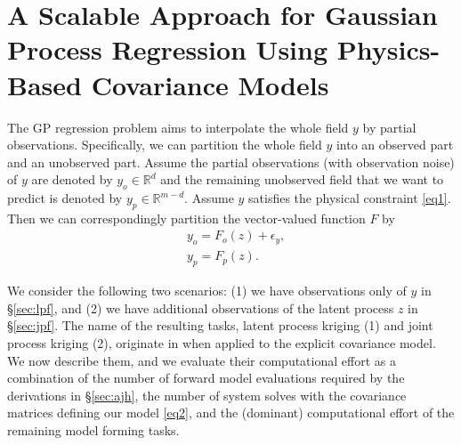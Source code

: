 \documentclass[article,ij4uq]{ij4uq}              %
\begin{document}
\section{A Scalable Approach for Gaussian Process Regression Using Physics-Based Covariance Models}\label{sec3}
\par The GP regression problem aims to interpolate the whole field $y$ by partial observations. Specifically, we can partition the whole field $y$ into an observed part and an unobserved part. Assume the partial observations (with observation noise) of $y$ are denoted by $y_{o}\in\mathbb{R}^{d}$ and the remaining unobserved field that we want to predict is denoted by $y_{p}\in\mathbb{R}^{m-d}$. Assume $y$ satisfies the physical constraint \eqref{eq1}. Then we can correspondingly partition the vector-valued function $F$ by
\begin{align}
    &y_{o}=F_{o}(z)+\epsilon_{y},\label{eq16}\\
    &y_{p}=F_{p}(z).\label{eq17}
\end{align}
\par We consider the following two scenarios: (1) we  have observations only of $y$ in \S \ref{sec:lpf}, and (2) we have additional observations of the latent process $z$ in \S \ref{sec:jpf}. The name of the resulting tasks, latent process kriging (1) and joint process kriging (2), originate in \cite{CovModel} when applied to the explicit covariance model. We now describe them, and we evaluate their computational effort as a combination of the number of forward model evaluations required by the derivations in \S \ref{sec:ajh}, the number of system solves with the covariance matrices defining our model \eqref{eq2}, and the (dominant) computational effort of the remaining model forming tasks.  
\end{document}
